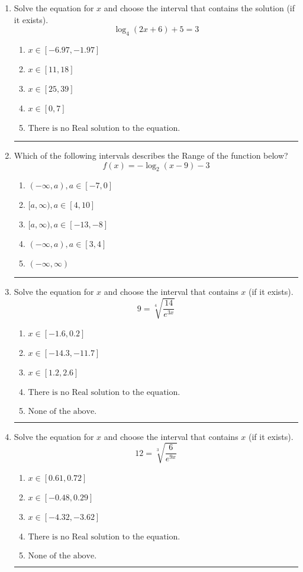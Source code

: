 \documentclass[14pt]{extbook}
\newcommand{\litem}[1]{\item#1\hspace*{-1cm}\rule{\textwidth}{0.4pt}}
\begin{document}
\begin{enumerate}
\litem{
Solve the equation for $x$ and choose the interval that contains the solution (if it exists).\[ \log_{4}{(2x+6)}+5 = 3 \]\begin{enumerate}[label=\Alph*.]
\item \( x \in [-6.97, -1.97] \)
\item \( x \in [11, 18] \)
\item \( x \in [25, 39] \)
\item \( x \in [0, 7] \)
\item \( \text{There is no Real solution to the equation.} \)

\end{enumerate} }
\litem{
Which of the following intervals describes the Range of the function below?\[ f(x) = -\log_2{(x-9)}-3 \]\begin{enumerate}[label=\Alph*.]
\item \( (-\infty, a), a \in [-7, 0] \)
\item \( [a, \infty), a \in [4, 10] \)
\item \( [a, \infty), a \in [-13, -8] \)
\item \( (-\infty, a), a \in [3, 4] \)
\item \( (-\infty, \infty) \)

\end{enumerate} }
\litem{
 Solve the equation for $x$ and choose the interval that contains $x$ (if it exists).\[  9 = \sqrt[4]{\frac{14}{e^{3x}}} \]\begin{enumerate}[label=\Alph*.]
\item \( x \in [-1.6, 0.2] \)
\item \( x \in [-14.3, -11.7] \)
\item \( x \in [1.2, 2.6] \)
\item \( \text{There is no Real solution to the equation.} \)
\item \( \text{None of the above.} \)

\end{enumerate} }
\litem{
 Solve the equation for $x$ and choose the interval that contains $x$ (if it exists).\[  12 = \sqrt[3]{\frac{6}{e^{9x}}} \]\begin{enumerate}[label=\Alph*.]
\item \( x \in [0.61, 0.72] \)
\item \( x \in [-0.48, 0.29] \)
\item \( x \in [-4.32, -3.62] \)
\item \( \text{There is no Real solution to the equation.} \)
\item \( \text{None of the above.} \)


\end{enumerate}}
\end{enumerate}
\end{document}
